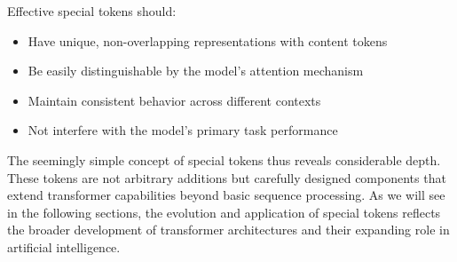 \begin{principle}
Effective special tokens should:
\begin{itemize}
\item Have unique, non-overlapping representations with content tokens
\item Be easily distinguishable by the model's attention mechanism
\item Maintain consistent behavior across different contexts
\item Not interfere with the model's primary task performance
\end{itemize}
\end{principle}

The seemingly simple concept of special tokens thus reveals considerable depth. These tokens are not arbitrary additions but carefully designed components that extend transformer capabilities beyond basic sequence processing. As we will see in the following sections, the evolution and application of special tokens reflects the broader development of transformer architectures and their expanding role in artificial intelligence.
